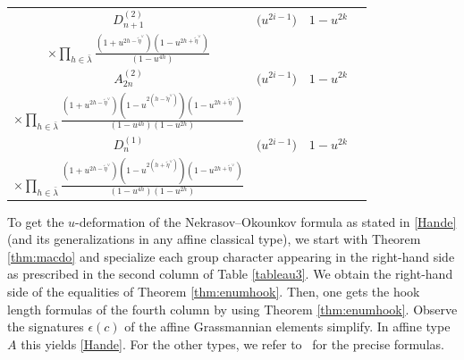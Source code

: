 \documentclass[pdftex]{sigma}
\numberwithin{equation}{section}
\def\cch{\mathcal H}
\begin{document}
\begin{table}[th]
\begin{tabular}{|c|c|c|c|}
\hline
\rule{0pt}{15pt}$D^{(2)}_{n+1}$& $\bigl(u^{2i-1}\bigr)$ & $1-u^{2k}$& \makecell{
$\varepsilon(c)(-1)^{\ell\bigl(\bar{\lambda}\bigr)}\displaystyle \prod_{h\in\cch(\lambda)_T}\frac{(1-u^{2(h-\tilde{\eta}^{\vee})})(1-u^{2(h+\tilde{\eta}^{\vee})})}{(1-u^{2h})^2}$\vspace{1mm}\\
$\displaystyle \times \prod_{h\in\bar{\lambda}}\frac{(1+u^{2h-\tilde{\eta}^{\vee}})(1-u^{2h+\tilde{\eta}^{\vee}})}{(1-u^{4h})}$}
\\
\hline
\rule{0pt}{15pt}$A^{(2)}_{2n}$& $\bigl(u^{2i-1}\bigr)$ & $1-u^{2k}$&\makecell{
$\varepsilon(c)\displaystyle u^{\tilde{\eta}^{\vee}\ell\bigl(\bar{\lambda}\bigr)} \prod_{h\in\cch(\lambda)_T}\frac{(1-u^{2(h-\tilde{\eta}^{\vee})})(1-u^{2(h+\tilde{\eta}^{\vee})})}{(1-u^{2h})^2}$\vspace{1mm}\\ $\displaystyle\times\prod_{h\in\bar{\lambda}}\frac{(1+u^{2h-\tilde{\eta}^{\vee}})(1-u^{2(h-\tilde{\eta}^{\vee})})(1-u^{2h+\tilde{\eta}^{\vee}})}{(1-u^{4h})(1-u^{2h})}$}
\\
\hline
\rule{0pt}{15pt}$D^{(1)}_{n}$& $\bigl(u^{2i-1}\bigr)$ & $1-u^{2k}$&\makecell{
$\varepsilon(c)(-1)^{\ell\bigl(\bar{\lambda}\bigr)}\displaystyle u^{-2\tilde{\eta}^{\vee}\ell\bigl(\bar{\lambda}\bigr)}\prod_{h\in\cch(\lambda)_T} \frac{(1-u^{2(h-\tilde{\eta}^{\vee})})(1-u^{2(h+\tilde{\eta}^{\vee})})}{(1-u^{2h})^2}
$
\vspace{1mm}\\
$\displaystyle\times \prod_{h\in\bar{\lambda}}\frac{(1+u^{2h-\tilde{\eta}^{\vee}})(1-u^{2(h+\tilde{\eta}^{\vee})}) (1-u^{2h+\tilde{\eta}^{\vee}})}{(1-u^{4h})(1-u^{2h})}$}
\\
\hline
\end{tabular}
\end{table}

To get the $u$-deformation of the Nekrasov--Okounkov formula as stated in \eqref{Hande} (and its generalizations in any affine classical type), we start with Theorem \ref{thm:macdo} and specialize each group character appearing in the right-hand side as prescribed in the second column of Table \ref{tableau3}. We obtain the right-hand side of the equalities of Theorem \ref{thm:enumhook}.
Then, one gets the hook length formulas of the fourth column by using Theorem \ref{thm:enumhook}. Observe the signatures $\epsilon(c)$ of the affine Grassmannian elements simplify. In affine type $A$ this yields \eqref{Hande}. For the other types, we refer to~\cite[Section 5.3]{Wmac} for the precise formulas.
\end{document}
